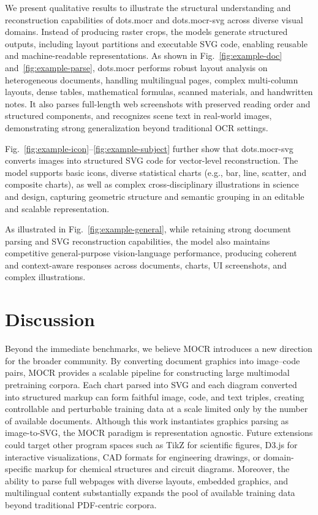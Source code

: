 \documentclass{article}
\begin{document}
We present qualitative results to illustrate the structural understanding and reconstruction capabilities of dots.mocr and dots.mocr-svg across diverse visual domains. Instead of producing raster crops, the models generate structured outputs, including layout partitions and executable SVG code, enabling reusable and machine-readable representations. As shown in Fig.~\ref{fig:example-doc} and~\ref{fig:example-parse}, dots.mocr performs robust layout analysis on heterogeneous documents, handling multilingual pages, complex multi-column layouts, dense tables, mathematical formulas, scanned materials, and handwritten notes. It also parses full-length web screenshots with preserved reading order and structured components, and recognizes scene text in real-world images, demonstrating strong generalization beyond traditional OCR settings. 

Fig.~\ref{fig:example-icon}--\ref{fig:example-subject} further show that dots.mocr-svg converts images into structured SVG code for vector-level reconstruction. The model supports basic icons, diverse statistical charts (e.g., bar, line, scatter, and composite charts), as well as complex cross-disciplinary illustrations in science and design, capturing geometric structure and semantic grouping in an editable and scalable representation. 

As illustrated in Fig.~\ref{fig:example-general}, while retaining strong document parsing and SVG reconstruction capabilities, the model also maintains competitive general-purpose vision-language performance, producing coherent and context-aware responses across documents, charts, UI screenshots, and complex illustrations.

\section{Discussion}
\label{sec:discuss}
Beyond the immediate benchmarks, we believe MOCR introduces a new direction for the broader community. By converting document graphics into image–code pairs, MOCR provides a scalable pipeline for constructing large multimodal pretraining corpora. Each chart parsed into SVG and each diagram converted into structured markup can form faithful image, code, and text triples, creating controllable and perturbable training data at a scale limited only by the number of available documents. Although this work instantiates graphics parsing as image-to-SVG, the MOCR paradigm is representation agnostic. Future extensions could target other program spaces such as TikZ for scientific figures, D3.js for interactive visualizations, CAD formats for engineering drawings, or domain-specific markup for chemical structures and circuit diagrams. Moreover, the ability to parse full webpages with diverse layouts, embedded graphics, and multilingual content substantially expands the pool of available training data beyond traditional PDF-centric corpora.
\end{document}
